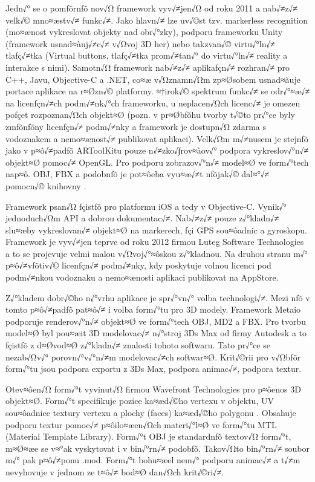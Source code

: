\documentclass[twoside,12pt]{article}
\begin{document}
Jedn√° se o pomƒõrnƒõ nov√Ω framework vyv√≠jen√Ω od roku 2011 a nab√≠z√≠ velk√© mno≈æstv√≠ funkc√≠. Jako hlavn√≠ lze uv√©st tzv. markerless recognition (mo≈ænost vykreslovat objekty nad obr√°zky), podporu frameworku Unity (framework usnad≈àuj√≠c√≠ v√Ωvoj 3D her) nebo takzvan√© virtu√°ln√≠ tlaƒç√≠tka (Virtual buttons, tlaƒç√≠tka prom√≠tan√° do virtu√°ln√≠ reality a interakce s nimi). Samotn√Ω framework nab√≠z√≠ aplikaƒçn√≠ rozhran√≠ pro C++, Javu, Objective-C a .NET, co≈æ v√Ωznamn√Ωm zp≈Øsobem usnad≈àuje portace aplikace na r≈Øzn√© platformy. ≈†irok√© spektrum funkc√≠ se odr√°≈æ√≠ na licenƒçn√≠ch podm√≠nk√°ch frameworku, u neplacen√Ωch licenc√≠ je omezen poƒçet rozpoznan√Ωch objekt≈Ø (pozn. v pr≈Øbƒõhu tvorby t√©to pr√°ce byly zmƒõnƒõny licenƒçn√≠ podm√≠nky a framework je dostupn√Ω zdarma s vodoznakem a nemo≈ænost√≠ publikovat aplikaci). Velk√Ωm m√≠nusem je stejnƒõ jako v p≈ô√≠padƒõ ARToolKitu pouze n√≠zko√∫rov≈àov√° podpora vykreslov√°n√≠ objekt≈Ø pomoc√≠ OpenGL. Pro podporu zobrazov√°n√≠ model≈Ø ve form√°tech nap≈ô. OBJ, FBX a podobnƒõ je pot≈ôeba vyu≈æ√≠t nƒõjak√© dal≈°√≠ pomocn√© knihovny \cite{vuforia_3dformats}.

Framework psan√Ω ƒçistƒõ pro platformu iOS a tedy v Objective-C. Vynik√° jednoduch√Ωm API a dobrou dokumentac√≠. Nab√≠z√≠ pouze z√°kladn√≠ slu≈æby vykreslovan√≠ objekt≈Ø na markerech, ƒçi GPS sou≈ôadnic a gyroskopu. Framework je vyv√≠jen teprve od roku 2012 firmou Luteg Software Technologies a to se projevuje velmi malou v√Ωvoj√°≈ôskou z√°kladnou. Na druhou stranu m√° p≈ô√≠vƒõtiv√© licenƒçn√≠ podm√≠nky, kdy poskytuje volnou licenci pod podm√≠nkou vodoznaku a nemo≈ænosti aplikaci publikovat na AppStore. 


% 
\newpage
{}
Z√°kladem dobr√©ho n√°vrhu aplikace je spr√°vn√° volba technologi√≠. Mezi nƒõ v tomto p≈ô√≠padƒõ pat≈ô√≠ i volba form√°tu pro 3D modely. Framework Metaio podporuje renderov√°n√≠ objekt≈Ø ve form√°tech OBJ, MD2 a FBX. Pro tvorbu model≈Ø byl pou≈æit 3D modelovac√≠ n√°stroj 3Ds Max od firmy Autodesk a to ƒçistƒõ z d≈Øvod≈Ø z√°kladn√≠ znalosti tohoto softwaru. Tato pr√°ce se nezab√Ωv√° porovn√°v√°n√≠m modelovac√≠ch softwar≈Ø. Krit√©rii pro v√Ωbƒõr form√°tu jsou podpora exportu z 3Ds Max, podpora animac√≠, podpora textur.

Otev≈ôen√Ω form√°t vyvinut√Ω firmou Wavefront Technologies pro p≈ôenos 3D objekt≈Ø. Form√°t specifikuje pozice ka≈æd√©ho vertexu v objektu, UV sou≈ôadnice textury vertexu a plochy (faces) ka≈æd√©ho polygonu \cite{obj_wiki}. Obsahuje podporu textur pomoc√≠ p≈ôilo≈æen√Ωch materi√°l≈Ø ve form√°tu MTL (Material Template Library). Form√°t OBJ je standardnƒõ textov√Ω form√°t, m≈Ø≈æe se v≈°ak vyskytovat i v bin√°rn√≠ podobƒõ. Takov√Ωto bin√°rn√≠ soubor m√° pak p≈ô√≠ponu .mod. Form√°t bohu≈æel nem√° podporu animac√≠ \cite{obj_doc} a t√≠m nevyhovuje v jednom ze t≈ô√≠ bod≈Ø dan√Ωch krit√©ri√≠.
\end{document}
